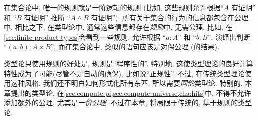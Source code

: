 在集合论中, 唯一的规则就是一阶逻辑的规则 (比如, 这些规则允许根据``$A$ 有证明'' 和 ``$B$ 有证明'' 推断 ``$A\wedge B$ 有证明''): 所有关于集合的行为的信息都包含在公理中.
相比之下, 在类型论中, 通常这些信息都存在\emph{规则}中, 无需公理.
比如, 在\cref{sec:finite-product-types}会看到一些规则, 允许根据 ``$a:A$'' 和 ``$b:B$'', 演绎出判断 ``$(a,b):A\times B$'', 而在集合论中, 类似的语句应该是对偶公理 (的结果).

类型论只使用规则的好处是, 规则是``程序性的''.
特别地, 这使类型理论的良好计算特性成为了可能(尽管不是自动的确保), 比如说``正规性''.
%
不过, 在传统类型理论使用这种风格, 我们还不明白如何形式化所有东西, 所以需要\emph{同伦}类型论.
特别的, 本章提出的类型论, 在\cref{sec:compute-pi,sec:compute-universe,cha:hits}中, 不得不允许添加额外的公理, 尤其是\emph{一价公理}.
不过在本章, 将局限于传统的, 基于规则的类型论.